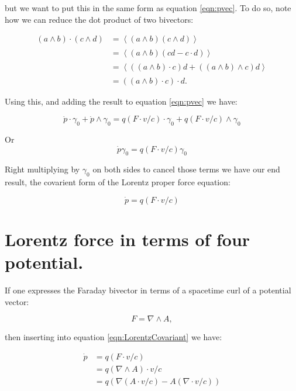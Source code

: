 \documentclass{article}
\newcommand{\gpgrade}[2] {{\left\langle{{#1}}\right\rangle}_{#2}}
\newcommand{\gpgradezero}[1] {\gpgrade{#1}{}}
\newcommand{\grad}[0] {\nabla}
\begin{document}
but we want to put this in the same form as equation \ref{eqn:pvec}.  To do so, note how we can reduce the dot product of two bivectors:

\begin{align*}
( a \wedge b ) \cdot ( c \wedge d )
&= \gpgradezero{ ( a \wedge b ) ( c \wedge d ) } \\
&= \gpgradezero{ ( a \wedge b ) ( c d - c \cdot d ) } \\
&= \gpgradezero{ (( a \wedge b ) \cdot c) d + (( a \wedge b ) \wedge c) d } \\
&= (( a \wedge b ) \cdot c) \cdot d .
\end{align*}

Using this, and adding the result to equation \ref{eqn:pvec} we have:

\begin{equation*}
\dot{p} \cdot \gamma_0 + \dot{p} \wedge \gamma_0 = q (F \cdot v/c) \cdot \gamma_0 + q ( F \cdot v/c ) \wedge \gamma_0
\end{equation*}

Or
\begin{equation*}
\dot{p} \gamma_0 = q (F \cdot v/c) \gamma_0
\end{equation*}

Right multiplying by $\gamma_0$ on both sides to cancel those terms we have our end result, the covarient form of the Lorentz proper force equation:

\begin{equation}\label{eqn:LorentzCovariant}
\dot{p} = q ( F \cdot v/c )
\end{equation}

\section{ Lorentz force in terms of four potential. }

If one expresses the Faraday bivector in terms of a spacetime curl of a potential vector:

\begin{equation}
F = \grad \wedge A,
\end{equation}

then inserting into equation \ref{eqn:LorentzCovariant} we have:

\begin{align*}
\dot{p}
&= q ( F \cdot v/c )  \\
&= q (\grad \wedge A) \cdot v/c \\
&= q \left( \grad (A \cdot v/c) - A (\grad \cdot v/c) \right)
\end{align*}
\end{document}
